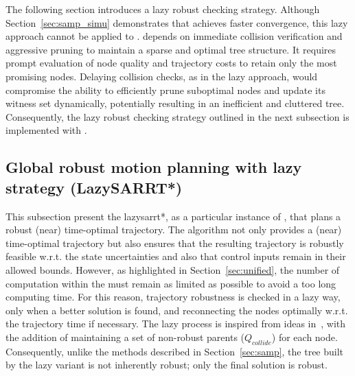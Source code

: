 The following section introduces a lazy robust checking strategy. 
Although Section~\ref{sec:samp_simu} demonstrates that  achieves faster convergence, this lazy approach cannot be applied to . 
 depends on immediate collision verification and aggressive pruning to maintain a sparse and optimal tree structure. 
It requires prompt evaluation of node quality and trajectory costs to retain only the most promising nodes.
Delaying collision checks, as in the lazy approach, would compromise the  ability to efficiently prune suboptimal nodes and update its witness set dynamically, potentially resulting in an inefficient and cluttered tree. 
Consequently, the lazy robust checking strategy outlined in the next subsection is implemented with .

\subsection{Global robust motion planning with lazy strategy (LazySARRT*)}\label{sec:lazy_rrt*}

This subsection present the \gls{lazysarrt*}, as a particular instance of , that plans a robust (near) time-optimal trajectory.
The algorithm not only provides a (near) time-optimal trajectory but also ensures that the resulting trajectory is robustly feasible w.r.t. the state uncertainties and also that control inputs remain in their allowed bounds.
However, as highlighted in Section~\ref{sec:unified}, the number of  computation within the  must remain as limited as possible to avoid a too long computing time. 
For this reason, trajectory robustness is checked in a lazy way, only when a better solution is found, and reconnecting the nodes optimally w.r.t. the trajectory time if necessary.
The lazy process is inspired from ideas in~\cite{cLazy1,cLazy2}, with the addition of maintaining a set of non-robust parents ($Q_{collide}$) for each node.
Consequently, unlike the  methods described in Section~\ref{sec:samp}, the tree built by the lazy variant is not inherently robust; only the final solution is robust.

